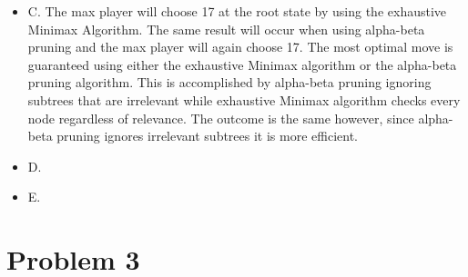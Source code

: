 \documentclass[10pt,a4paper]{article}
\begin{document}
\begin{itemize}
		\item 
		C. The max player will choose 17 at the root state by using the exhaustive Minimax Algorithm. The same result will occur when using alpha-beta pruning
		and the max player will again choose 17. The most optimal move is guaranteed using either the exhaustive Minimax algorithm or the alpha-beta pruning algorithm. This is accomplished by alpha-beta pruning ignoring subtrees that are irrelevant while exhaustive Minimax algorithm checks every node regardless of relevance. The outcome is the same however, since alpha-beta pruning ignores irrelevant subtrees it is more efficient.
		
		\item
		D. 
		
		\item
		E. 
	\end{itemize}
	\clearpage
	\section*{Problem 3}
\end{document}
